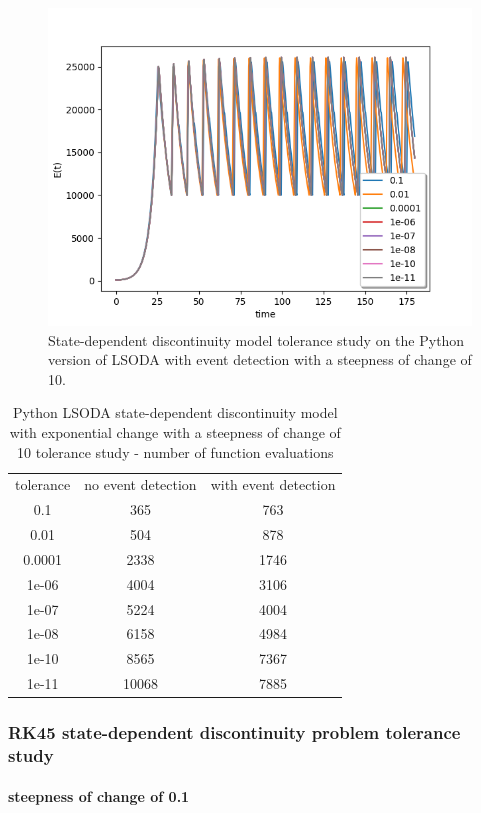 \begin{figure}[H]
\centering
\includegraphics[width=0.7\linewidth]{./figures/exp_state_tol_lsoda_event_10}
\caption{State-dependent discontinuity model tolerance study on the Python version of LSODA with event detection with a steepness of change of 10.}
\label{fig:exp_state_tol_lsoda_event_10}
\end{figure}

\begin{table}[H]
\caption {Python LSODA state-dependent discontinuity model with exponential change with a steepness of change of 10 tolerance study - number of function evaluations} \label{tab:exp_state_tol_lsoda_10} 
\begin{center}
\begin{tabular}{ c c c }
tolerance & no event detection & with event detection \\ 
0.1 & 365 & 763 \\
0.01 & 504 & 878 \\
0.0001 & 2338 & 1746 \\
1e-06 & 4004 & 3106 \\
1e-07 & 5224 & 4004 \\
1e-08 & 6158 & 4984 \\
1e-10 & 8565 & 7367 \\
1e-11 & 10068 & 7885 \\
\end{tabular}
\end{center}
\end{table}



\subsubsection{RK45 state-dependent discontinuity problem tolerance study}
\paragraph{steepness of change of 0.1}


